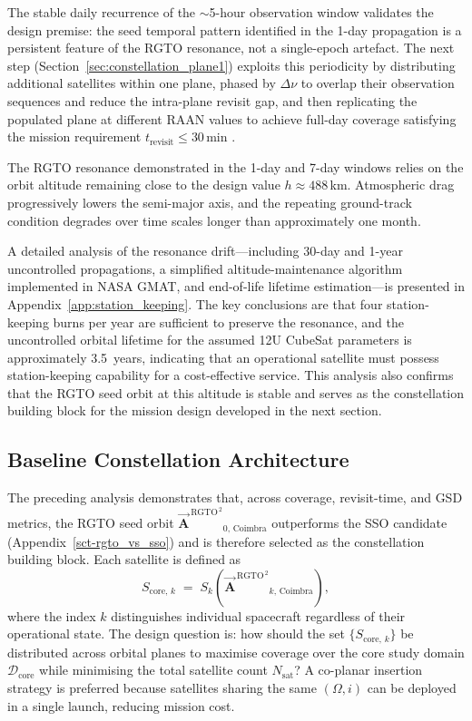 The stable daily recurrence of the $\sim$5-hour observation window validates the design premise: the seed temporal pattern identified in the 1-day propagation is a persistent feature of the RGTO resonance, not a single-epoch artefact.  The next step (Section~\ref{sec:constellation_plane1}) exploits this periodicity by distributing additional satellites within one plane, phased by $\Delta\nu$ to overlap their observation sequences and reduce the intra-plane revisit gap, and then replicating the populated plane at different RAAN values to achieve full-day coverage satisfying the mission requirement $t_{\text{revisit}} \leq 30$\,min .


The RGTO resonance demonstrated in the 1-day and 7-day windows relies on the orbit altitude remaining close to the design value $h \approx 488$\,km.  Atmospheric drag progressively lowers the semi-major axis, and the repeating ground-track condition degrades over time scales longer than approximately one month.  

A detailed analysis of the resonance drift---including 30-day and 1-year uncontrolled propagations, a simplified altitude-maintenance algorithm implemented in NASA GMAT, and end-of-life lifetime estimation---is presented in Appendix~\ref{app:station_keeping}.  
The key conclusions are that four station-keeping burns per year are sufficient to preserve the resonance, and the uncontrolled orbital lifetime for the assumed 12U CubeSat parameters is approximately 3.5~years, indicating that an operational satellite must possess station-keeping capability for a cost-effective service.  This analysis also confirms that the RGTO seed orbit at this altitude is stable and serves as the constellation building block for the mission design developed in the next section.

\subsection{Baseline Constellation Architecture}\label{sec:baseline_constellation_architecture}

The preceding analysis demonstrates that, across coverage, revisit-time, and GSD metrics, the RGTO seed orbit $\vec{\mathbf{A}}^{\,\mathrm{RGTO}^{\,2}}{}_{0,\,\mathrm{Coimbra}}$ outperforms the SSO candidate (Appendix~\ref{sct-rgto_vs_sso}) and is therefore selected as the constellation building block.  Each satellite is defined as
\begin{equation}
  S_{\mathrm{core},\,k} \;=\; S_k\!\left(\vec{\mathbf{A}}^{\,\mathrm{RGTO}^{\,2}}{}_{k,\,\mathrm{Coimbra}}\right),
\end{equation}
where the index $k$ distinguishes individual spacecraft regardless of their operational state.  The design question is: how should the set $\{S_{\mathrm{core},\,k}\}$ be distributed across orbital planes to maximise coverage over the core study domain $\mathcal{D}_{\mathrm{core}}$ while minimising the total satellite count $N_{\mathrm{sat}}$?  A co-planar insertion strategy is preferred because satellites sharing the same $(\Omega, i)$ can be deployed in a single launch, reducing mission cost.

